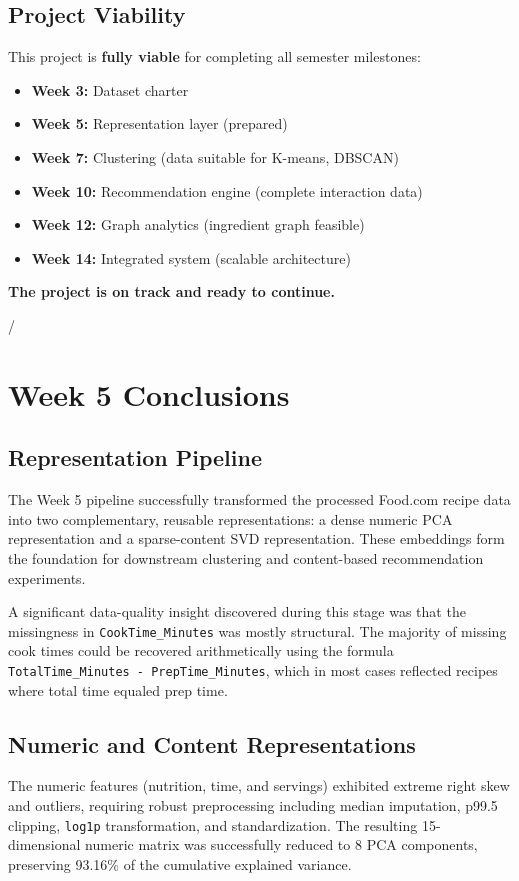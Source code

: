 \documentclass[11pt,a4paper]{article}
\begin{document}
\subsection{Project Viability}

This project is \textbf{fully viable} for completing all semester milestones:

\begin{itemize}
    \item \checkmark \textbf{Week 3:} Dataset charter \checkmark
    \item \checkmark \textbf{Week 5:} Representation layer (prepared)
    \item \checkmark \textbf{Week 7:} Clustering (data suitable for K-means, DBSCAN)
    \item \checkmark \textbf{Week 10:} Recommendation engine (complete interaction data)
    \item \checkmark \textbf{Week 12:} Graph analytics (ingredient graph feasible)
    \item \checkmark \textbf{Week 14:} Integrated system (scalable architecture)
\end{itemize}

\textbf{The project is on track and ready to continue.}

\appendix

/

\section{Week 5 Conclusions}

\subsection{Representation Pipeline}
The Week 5 pipeline successfully transformed the processed Food.com recipe data into two complementary, reusable representations: a dense numeric PCA representation and a sparse-content SVD representation. These embeddings form the foundation for downstream clustering and content-based recommendation experiments.

A significant data-quality insight discovered during this stage was that the missingness in \texttt{CookTime\_Minutes} was mostly structural. The majority of missing cook times could be recovered arithmetically using the formula \texttt{TotalTime\_Minutes - PrepTime\_Minutes}, which in most cases reflected recipes where total time equaled prep time.

\subsection{Numeric and Content Representations}
The numeric features (nutrition, time, and servings) exhibited extreme right skew and outliers, requiring robust preprocessing including median imputation, p99.5 clipping, \texttt{log1p} transformation, and standardization. The resulting 15-dimensional numeric matrix was successfully reduced to 8 PCA components, preserving 93.16\% of the cumulative explained variance.
\end{document}

